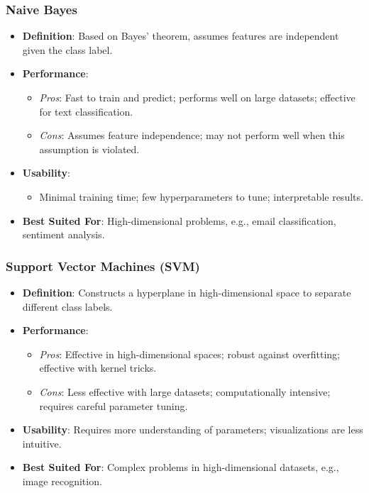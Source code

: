 \documentclass[aspectratio=169]{beamer}
\begin{document}
\begin{frame}[fragile]
    \frametitle{Naive Bayes}
    \begin{itemize}
        \item \textbf{Definition}: Based on Bayes' theorem, assumes features are independent given the class label.
        \item \textbf{Performance}:
            \begin{itemize}
                \item \textit{Pros}: Fast to train and predict; performs well on large datasets; effective for text classification.
                \item \textit{Cons}: Assumes feature independence; may not perform well when this assumption is violated.
            \end{itemize}
        \item \textbf{Usability}: 
            \begin{itemize}
                \item Minimal training time; few hyperparameters to tune; interpretable results.
            \end{itemize}
        \item \textbf{Best Suited For}: High-dimensional problems, e.g., email classification, sentiment analysis.
    \end{itemize}
\end{frame}

\begin{frame}[fragile]
    \frametitle{Support Vector Machines (SVM)}
    \begin{itemize}
        \item \textbf{Definition}: Constructs a hyperplane in high-dimensional space to separate different class labels.
        \item \textbf{Performance}:
            \begin{itemize}
                \item \textit{Pros}: Effective in high-dimensional spaces; robust against overfitting; effective with kernel tricks.
                \item \textit{Cons}: Less effective with large datasets; computationally intensive; requires careful parameter tuning.
            \end{itemize}
        \item \textbf{Usability}: Requires more understanding of parameters; visualizations are less intuitive.
        \item \textbf{Best Suited For}: Complex problems in high-dimensional datasets, e.g., image recognition.
    \end{itemize}
\end{frame}
\end{document}
